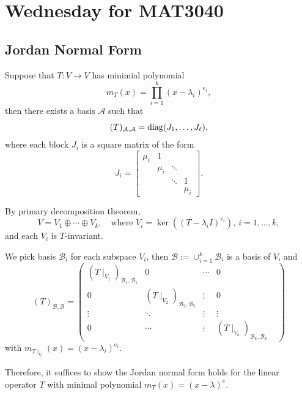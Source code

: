 
\section{Wednesday for MAT3040}
\subsection{Jordan Normal Form}
\begin{theorem}\label{The:9:3}
Suppose that $T:V\to V$ has minimial polynomial 
\[
m_T(x) = \prod_{i=1}^k(x-\lambda_i)^{e_i},
\]
then there exists a basis $\mathcal{A}$ such that
\[
(T)_{\mathcal{A},\mathcal{A}}=\operatorname{diag}(J_1,\dots,J_\ell),
\]
where each block $J_i$ is a square matrix of the form
\[
J_i = 
\begin{bmatrix}
\mu_i & 1            & \;     & \;  \\
\;        & \mu_i    & \ddots & \;  \\
\;        & \;           & \ddots & 1   \\
\;        & \;           & \;     & \mu_i       
\end{bmatrix}.
\]
\end{theorem}
\begin{remark}
By primary decomposition theorem,
\[
V=V_1\oplus \cdots\oplus V_k,\quad
\text{where }
V_i = \ker((T - \lambda_iI)^{e_i}),\ i=1,\dots,k,
\]
and each $V_i$ is $T$-invariant.

We pick basis $\mathcal{B}_i$ for each subspace $V_i$, then 
$\mathcal{B}:=\cup_{i=1}^k\mathcal{B}_i$ is a basis of $V$, 
and
\[
(T)_{\mathcal{B},\mathcal{B}}
=
\begin{pmatrix}
(T\mid_{V_1})_{\mathcal{B}_1,\mathcal{B}_1}&0&\cdots&0\\
0&(T\mid_{V_2})_{\mathcal{B}_2,\mathcal{B}_2}&\vdots&0\\
\vdots&\ddots&\vdots&\vdots&\\
0&\cdots&\vdots&(T\mid_{V_k})_{\mathcal{B}_k,\mathcal{B}_k}
\end{pmatrix}
\]
with $m_{T\mid_{V_i}}(x) = (x-\lambda_i)^{e_i}$.
\end{remark}

Therefore, it suffices to show the Jordan normal form holds for the linear operator $T$ with minimal polynomial $m_T(x) = (x-\lambda)^e$.
%


